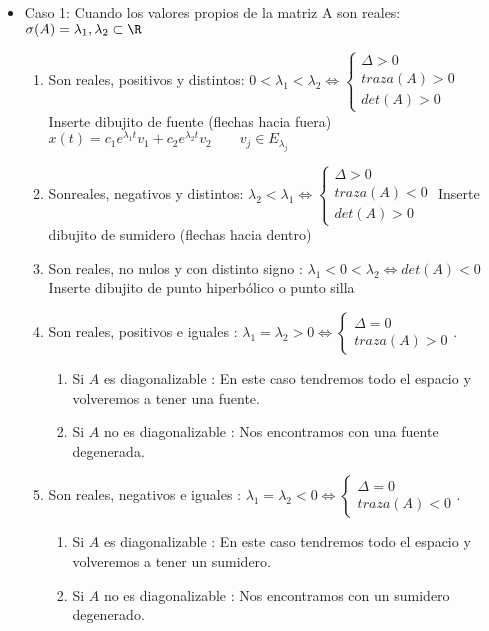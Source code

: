 {\begin{itemize}
\item Caso 1: Cuando los valores propios de la matriz A son reales: $\sigma(A)={\lambda_1,\lambda_2}\subset \R$
\begin{enumerate}
\item Son reales, positivos y distintos: $0<\lambda_1<\lambda_2 \Leftrightarrow \left\{ \begin{array}{ll}\Delta > 0 \\ traza(A)>0 \\ det(A) > 0 \end{array}\right.$
Inserte dibujito de fuente (flechas hacia fuera)
$x(t)=c_1 e^{\lambda_1t}v_1+c_2 e^{\lambda_2t}v_2 \qquad v_j \in E_{\lambda_j}$
\item Sonreales, negativos y distintos: $\lambda_2 < \lambda_1 \Leftrightarrow \left\{ \begin{array}{ll}\Delta > 0 \\ traza(A) < 0 \\ det(A)>0\end{array}\right.$
Inserte dibujito de sumidero (flechas hacia dentro)
\item Son reales, no nulos y con distinto signo : $\lambda_1 < 0 < \lambda_2 \Leftrightarrow det(A)<0$
Inserte dibujito de punto hiperbólico o punto silla
\item Son reales, positivos e iguales : $\lambda_1=\lambda_2>0 \Leftrightarrow \left\{ \begin{array}{ll} \Delta = 0 \\ traza(A)>0\end{array}\right.$.
\begin{enumerate}
\item Si $A$ es diagonalizable : En este caso tendremos todo el espacio y volveremos a tener una fuente.
\item Si $A$ no es diagonalizable : Nos encontramos con una fuente degenerada.
\end{enumerate}
\item Son reales, negativos e iguales : $\lambda_1=\lambda_2<0 \Leftrightarrow \left\{ \begin{array}{ll} \Delta = 0 \\ traza(A)<0\end{array}\right.$.
\begin{enumerate}
\item Si $A$ es diagonalizable : En este caso tendremos todo el espacio y volveremos a tener un sumidero.
\item Si $A$ no es diagonalizable : Nos encontramos con un sumidero degenerado.

\end{enumerate}
\end{enumerate}
\end{itemize}}

